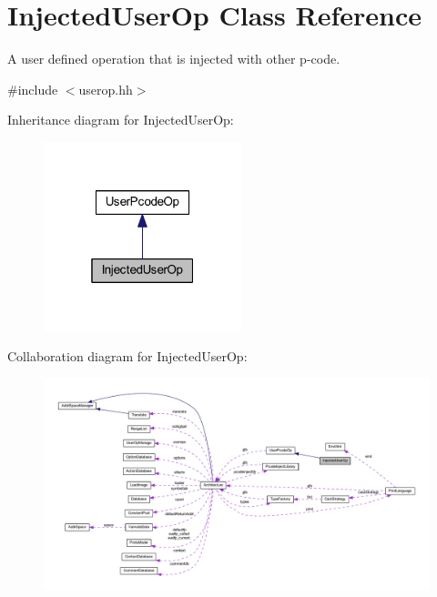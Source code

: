 \hypertarget{class_injected_user_op}{}\section{Injected\+User\+Op Class Reference}
\label{class_injected_user_op}


A user defined operation that is injected with other p-\/code.  




{\ttfamily \#include $<$userop.\+hh$>$}



Inheritance diagram for Injected\+User\+Op\+:
\nopagebreak
\begin{figure}[H]
\begin{center}
\leavevmode
\includegraphics[width=163pt]{class_injected_user_op__inherit__graph}
\end{center}
\end{figure}


Collaboration diagram for Injected\+User\+Op\+:
\nopagebreak
\begin{figure}[H]
\begin{center}
\leavevmode
\includegraphics[width=350pt]{class_injected_user_op__coll__graph}
\end{center}
\end{figure}
